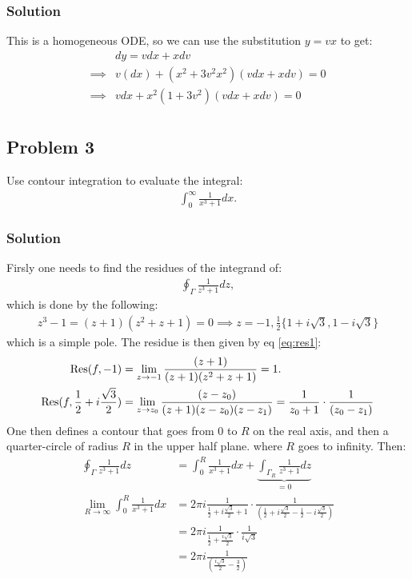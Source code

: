 \subsubsection*{Solution}
This is a homogeneous ODE, so we can use the substitution $y = vx$ to get:
\begin{align*}
    &dy = vdx + xdv\\
    \implies& v(dx) + (x^2 + 3v^2x^2)(vdx + xdv) = 0\\
    \implies& vdx + x^2(1 + 3v^2)(vdx + xdv) = 0\\
\end{align*}

\subsection*{Problem 3}
Use contour integration to evaluate the integral:
\begin{align*}
    \int_{0}^\infty \frac{1}{x^3 + 1}dx.
\end{align*}

\subsubsection*{Solution}
Firsly one needs to find the residues of the integrand of:
\begin{align*}
    \oint_\Gamma \frac{1}{z^3 + 1}dz,
\end{align*}which is done by the following:
\begin{align*}
    z^3 - 1= (z+ 1)(z^2+z+1) = 0\implies z = -1, \frac{1}{2}\{1 + i\sqrt{3}, 1- i\sqrt{3}\}
\end{align*}which is a simple pole. The residue is then given by eq \eqref{eq:res1}:
\begin{align*}
    \text{Res}(f,-1) &= \lim_{z\to-1}\frac{(z+1)}{(z+1)(z^2 + z + 1)} = 1.\\
    \text{Res}(f,\frac{1}{2} + i\frac{\sqrt{3}}{2})&=\lim_{z\to z_0}\frac{(z - z_0)}{(z+1)(z - z_0)(z -z_1)} = \frac{1}{z_0 + 1}\cdot\frac{1}{(z_0-z_1)}
\end{align*}One then defines a contour that goes from $0$ to $R$ on the real axis, and then a quarter-circle of radius $R$ in the upper half plane. where $R$ goes to infinity. Then:
\begin{align*}
    \oint_\Gamma\frac{1}{z^3 + 1}dz &= \int_{0}^R\frac{1}{x^3 + 1}dx + \underbrace{\int_{\Gamma_R}\frac{1}{z^3 + 1}dz}_{ = 0}\\
    \lim_{R\to\infty}\int_0^R\frac{1}{x^3 + 1}dx &= 2\pi i \frac{1}{\frac{1}{2} + i\frac{\sqrt{3}}{2} + 1}\cdot\frac{1}{(\frac{1}{2} + i\frac{\sqrt{3}}{2}-\frac{1}{2} - i\frac{\sqrt{3}}{2})}\\
    &= 2\pi i\frac{1}{\frac{1}{2} + \frac{i\sqrt{3}}{2}}\cdot\frac{1}{i\sqrt{3}}\\
    &=2\pi i\frac{1}{(\frac{i\sqrt{3}}{2} - \frac{3}{2})}
\end{align*}

